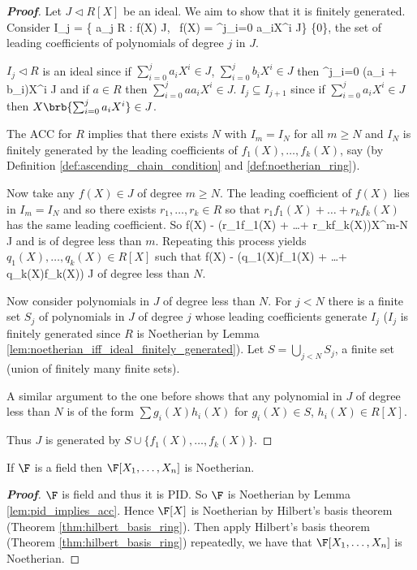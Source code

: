 \begin{proof}[\bf Proof]
Let $J \lhd R[X]$ be an ideal. We aim to show that it is finitely generated. Consider
\be
I_j = \left\{ a_j \in R : \exists f(X) \in J, \ f(X) = \sum^j_{i=0} a_iX^i \in J\right\} \cup \{0\},
\ee
the set of leading coefficients of polynomials of degree $j$ in $J$.

$I_j \lhd R$ is an ideal since if $\sum^j_{i=0} a_iX^i \in J$, $\sum^j_{i=0} b_iX^i \in J$ then
\be
\sum^j_{i=0} (a_i + b_i)X^i \in J
\ee
and if $a \in R$ then $\sum^j_{i=0} aa_iX^i \in J$. $I_j \subseteq I_{j+1}$ since if $\sum^j_{i=0} a_iX^i \in J$ then $X \brb{\sum^j_{i=0} a_iX^i} \in J$.

The ACC for $R$ implies that there exists $N$ with $I_m = I_N$ for all $m \geq N$ and $I_N$ is finitely generated by the leading coefficients of $f_1(X),\dots , f_k(X)$, say (by Definition \ref{def:ascending_chain_condition} and \ref{def:noetherian_ring}).

Now take any $f(X) \in J$ of degree $m \geq N$. The leading coefficient of $f(X)$ lies in $I_m = I_N$ and so there exists $r_1,\dots,r_k \in R$ so that $r_1f_1(X) + \dots + r_kf_k(X)$ has the same leading coefficient. So
\be
f(X) - (r_1f_1(X) + \dots + r_kf_k(X))X^{m-N} \in J
\ee
and is of degree less than $m$. Repeating this process yields $q_1(X),\dots , q_k(X) \in R[X]$ such that
\be
f(X) - (q_1(X)f_1(X) + \dots + q_k(X)f_k(X)) \in J
\ee
of degree less than $N$.

Now consider polynomials in $J$ of degree less than $N$. For $j < N$ there is a finite set $S_j$ of polynomials in $J$ of degree $j$ whose leading coefficients generate $I_j$ ($I_j$ is finitely generated since $R$ is Noetherian by Lemma \ref{lem:noetherian_iff_ideal_finitely_generated}). Let $S = \bigcup_{j<N} S_j$, a finite set (union of finitely many finite sets).

A similar argument to the one before shows that any polynomial in $J$ of degree less than $N$ is of the form $\sum g_i(X)h_i(X)$ for $g_i(X) \in S$, $h_i(X) \in R[X]$.

Thus $J$ is generated by $S \cup \{f_1(X),\dots,f_k(X)\}$.
\end{proof}

\begin{corollary}
If $\F$ is a field then $\F[X_1,\dots ,X_n]$ is Noetherian.
\end{corollary}

\begin{proof}[\bf Proof]
$\F$ is field and thus it is PID. So $\F$ is Noetherian by Lemma \ref{lem:pid_implies_acc}. Hence $\F[X]$ is Noetherian by Hilbert's basis theorem (Theorem \ref{thm:hilbert_basis_ring}). Then apply Hilbert's basis theorem (Theorem \ref{thm:hilbert_basis_ring}) repeatedly, we have that $\F[X_1,\dots ,X_n]$ is Noetherian.
\end{proof}

